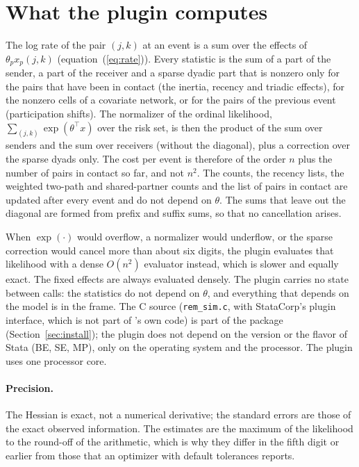 \section{What the plugin computes}\label{sec:plugin}

The log rate of the pair $(j,k)$ at an event is a sum over the effects of $\theta_p x_p(j,k)$ (equation~(\ref{eq:rate})). Every statistic is the sum of a part of the sender, a part of the receiver and a sparse dyadic part that is nonzero only for the pairs that have been in contact (the inertia, recency and triadic effects), for the nonzero cells of a covariate network, or for the pairs of the previous event (participation shifts). The normalizer of the ordinal likelihood, $\sum_{(j,k)}\exp(\theta^{\top}x)$ over the risk set, is then the product of the sum over senders and the sum over receivers (without the diagonal), plus a correction over the sparse dyads only. The cost per event is therefore of the order $n$ plus the number of pairs in contact so far, and not $n^2$. The counts, the recency lists, the weighted two-path and shared-partner counts and the list of pairs in contact are updated after every event and do not depend on $\theta$. The sums that leave out the diagonal are formed from prefix and suffix sums, so that no cancellation arises.

When $\exp(\cdot)$ would overflow, a normalizer would underflow, or the sparse correction would cancel more than about six digits, the plugin evaluates that likelihood with a dense $O(n^2)$ evaluator instead, which is slower and equally exact. The fixed effects are always evaluated densely. The plugin carries no state between calls: the statistics do not depend on $\theta$, and everything that depends on the model is in the frame. The C source (\texttt{rem\_sim.c}, with StataCorp's plugin interface, which is not part of \nwrem{}'s own code) is part of the package (Section~\ref{sec:install}); the plugin does not depend on the version or the flavor of Stata (BE, SE, MP), only on the operating system and the processor. The plugin uses one processor core.

\paragraph{Precision.} The Hessian is exact, not a numerical derivative; the standard errors are those of the exact observed information. The estimates are the maximum of the likelihood to the round-off of the arithmetic, which is why they differ in the fifth digit or earlier from those that an optimizer with default tolerances reports.

